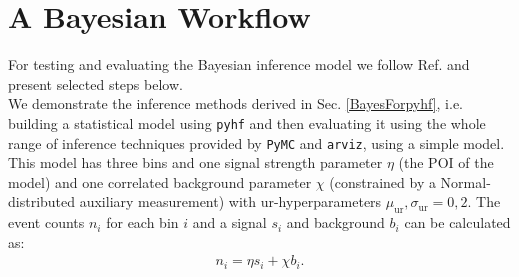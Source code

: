 \section{A Bayesian Workflow}{\label{BaysWF}} For testing and evaluating the Bayesian inference model we follow Ref. \cite{Betancourt2020} and present selected steps below. \\

\noindent We demonstrate the inference methods derived in Sec. \ref{BayesForpyhf}, i.e. building a statistical model using \texttt{pyhf} and then evaluating it using the whole range of inference techniques provided by \texttt{PyMC} and \texttt{arviz}, using a simple model. This model has three bins and one signal strength parameter $\eta$ (the POI of the model) and one correlated background parameter $\chi$ (constrained by a Normal-distributed auxiliary measurement) with ur-hyperparameters $\mu_{\text{ur}}, \sigma_{\text{ur}} = 0, 2$. The event counts $n_i$ for each bin $i$ and a signal $s_i$ and background $b_i$ can be calculated as:
    \begin{align} \label{binCounts}
        n_i = \eta s_i + \chi b_i.
    \end{align}

